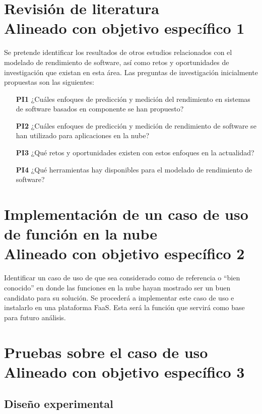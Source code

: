 \section[Revisión de literatura]{Revisión de literatura\\\small{Alineado con objetivo específico 1}}
Se pretende identificar los resultados de otros estudios relacionados con el modelado de rendimiento de software, así como retos y oportunidades de investigación que existan en esta área. Las preguntas de investigación inicialmente propuestas son las siguientes:
\begin{itemize}
    \item[\textbf{PI1}] ¿Cuáles enfoques de predicción y medición del rendimiento en sistemas de software basados en componente se han propuesto?
    \item[\textbf{PI2}] ¿Cuáles enfoques de predicción y medición de rendimiento de software se han utilizado para aplicaciones en la nube?
    \item[\textbf{PI3}] ¿Qué retos y oportunidades existen con estos enfoques en la actualidad?
    \item[\textbf{PI4}] ¿Qué herramientas hay disponibles para el modelado de rendimiento de software?
\end{itemize}

\section[Implementación de caso de uso de función en la nube]{Implementación de un caso de uso de función en la nube\\\small{Alineado con objetivo específico 2}}

Identificar un caso de uso de que sea considerado como de referencia o ``bien conocido'' en donde las funciones en la nube hayan mostrado ser un buen candidato para su solución. Se procederá a implementar este caso de uso e instalarlo en una plataforma FaaS. Esta será la función que servirá como base para futuro análisis.

\section[Pruebas sobre el caso de uso]{Pruebas sobre el caso de uso\\\small{Alineado con objetivo específico 3}}

\subsection{Diseño experimental}

